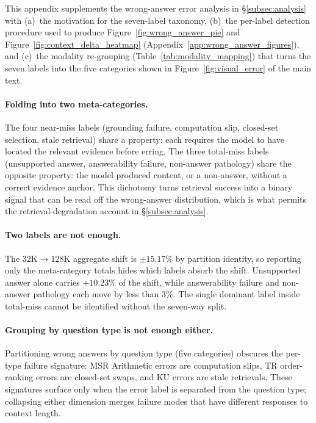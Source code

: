 \documentclass{llmxive}
\begin{document}
This appendix supplements the wrong-answer error analysis in \S\ref{subsec:analysis} with
(a)~the motivation for the seven-label taxonomy, (b)~the per-label detection procedure used
to produce Figure~\ref{fig:wrong_answer_pie} and Figure~\ref{fig:context_delta_heatmap}
(Appendix~\ref{app:wrong_answer_figures}), and (c)~the modality re-grouping
(Table~\ref{tab:modality_mapping}) that turns the seven labels into the five categories shown in
Figure~\ref{fig:visual_error} of the main text.

\paragraph{Folding into two meta-categories.}
The four near-miss labels (grounding failure, computation slip,
closed-set selection, stale retrieval) share a property: each requires
the model to have located the relevant evidence before erring.
The three total-miss labels (unsupported answer, answerability
failure, non-answer pathology) share the opposite property: the model
produced content, or a non-answer, without a correct evidence anchor.
This dichotomy turns retrieval success into a binary signal that can
be read off the wrong-answer distribution, which is what permits the
retrieval-degradation account in \S\ref{subsec:analysis}.

\paragraph{Two labels are not enough.}
The $32\text{K}\!\to\!128\text{K}$ aggregate shift is $\pm 15.17\%$
by partition identity, so reporting only the meta-category totals
hides which labels absorb the shift. Unsupported answer alone carries
$+10.23\%$ of the shift, while answerability failure and non-answer
pathology each move by less than $3\%$. The single dominant label
inside total-miss cannot be identified without the seven-way split.

\paragraph{Grouping by question type is not enough either.}
Partitioning wrong answers by question type (five categories) obscures
the per-type failure signature: MSR Arithmetic errors are computation
slips, TR order-ranking errors are closed-set swaps, and KU errors are stale
retrievals. These signatures surface only when the error label is
separated from the question type; collapsing either dimension merges
failure modes that have different responses to context length.
\end{document}
